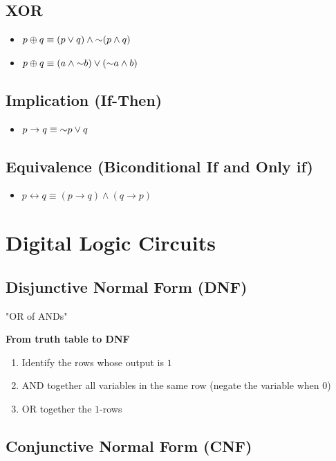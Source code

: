 \subsection{XOR}
\begin{itemize}
  \item $p \oplus q \equiv (p \vee q) \wedge \mathord{\sim} (p \wedge q)$
  \item $p \oplus q \equiv (a \wedge \mathord{\sim} b) \vee (\mathord{\sim} a \wedge b)$
\end{itemize}


\subsection{Implication (If-Then)}
\begin{itemize}
  \item $p \rightarrow q \equiv \mathord{\sim} p \vee q$
\end{itemize}

\subsection{Equivalence (Biconditional If and Only if)}
\begin{itemize}
  \item $p \leftrightarrow q \equiv (p \rightarrow q) \wedge (q \rightarrow p)$
\end{itemize}


\section{Digital Logic Circuits}
\label{sec:digital-logic-circuits}

\subsection{Disjunctive Normal Form (DNF)}

"OR of ANDs"

\textbf{From truth table to DNF}
\begin{enumerate}
  \item Identify the rows whose output is $1$
  \item AND together all variables in the same row (negate the variable when $0$)
  \item OR together the $1$-rows
\end{enumerate}

\subsection{Conjunctive Normal Form (CNF)}


